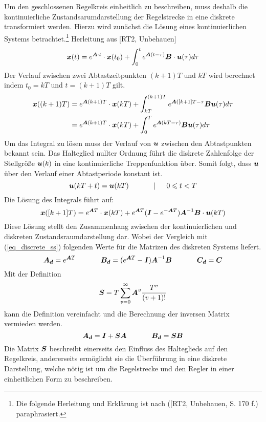 Um den geschlossenen Regelkreis einheitlich zu beschreiben, muss deshalb die kontinuierliche Zustandsarumdarstellung der Regelstrecke in eine diskrete transformiert werden. Hierzu wird zunächst die Lösung eines kontinuierlichen Systems  betrachtet.\footnote{Die folgende Herleitung und Erklärung ist nach ([RT2, Unbehauen, S. 170 f.) paraphrasiert.} Herleitung aus [RT2, Unbehauen]
\begin{equation}
\boldsymbol{x}(t) = e^{\boldsymbol{A}\cdot t}\cdot \boldsymbol{x}(t_0) + \int^t_0 e^{\boldsymbol{A}(t-\tau)}\boldsymbol{B}\cdot \boldsymbol{u}(\tau)d\tau
\end{equation}
Der Verlauf zwischen zwei Abtastzeitpunkten $(k+1)T$ und $kT$ wird berechnet indem $t_0=kT$ und $t=(k+1)T$ gilt.
\begin{equation}
\begin{split}
\boldsymbol{x}( (k+1)T) &= e^{\boldsymbol{A}(k+1)T}\cdot \boldsymbol{x}(kT) + \int^{(k+1)T}_{kT} e^{\boldsymbol{A}([k+1]T-\tau}\boldsymbol{B}\boldsymbol{u}(\tau)d\tau \\
&= e^{\boldsymbol{A}(k+1)T}\cdot \boldsymbol{x}(kT) + \int^T_0 e^{\boldsymbol{A}(kT-\tau)}\boldsymbol{B}\boldsymbol{u}(\tau)d\tau
\end{split}
\end{equation}
Um das Integral zu lösen muss der Verlauf von $\boldsymbol{u}$ zwischen den Abtastpunkten bekannt sein. Das Halteglied nullter Ordnung führt die diskrete Zahlenfolge der Stellgröße $\boldsymbol{u}(k)$ in eine kontinuierliche Treppenfunktion über. Somit folgt, dass $\boldsymbol{u}$ über den Verlauf einer Abtastperiode konstant ist.
\begin{equation}
\boldsymbol{u}(kT+t) = \boldsymbol{u}(kT) \hspace{35pt} \vert \hspace{15pt} 0 \leqslant t < T
\end{equation}
Die Lösung des Integrals führt auf:
\begin{equation}
\boldsymbol{x}([k+1]T) = e^{\boldsymbol{A}T}\cdot \boldsymbol{x}(kT) + e^{\boldsymbol{A}T}(\boldsymbol{I}-e^{-\boldsymbol{A}T})\boldsymbol{A}^{-1}\boldsymbol{B}\cdot \boldsymbol{u}(kT)
\end{equation}
Diese Lösung stellt den Zusammenhang zwischen der kontinuierlichen und diskreten Zustandsraumdarstellung dar. Wobei der Vergleich mit (\ref{eq_discrete_ss}) folgenden Werte für die Matrizen des diskreten Systems  liefert.
\begin{equation}
\boldsymbol{A_d} = e^{\boldsymbol{A}T} \hspace{35pt} \boldsymbol{B_d} = (e^{\boldsymbol{A}T}-\boldsymbol{I})\boldsymbol{A}^{-1}\boldsymbol{B} \hspace{35pt} \boldsymbol{C_d} = \boldsymbol{C}
\end{equation}
Mit der Definition
\begin{equation}
\boldsymbol{S} = T \sum^{\infty}_{v=0}\boldsymbol{A}^v\frac{T^v}{(v+1)!}
\end{equation}
kann die Definition vereinfacht und die Berechnung der inversen Matrix vermieden werden.
\begin{equation}
\boldsymbol{A_d} = \boldsymbol{I}+\boldsymbol{S}\boldsymbol{A}\hspace{35pt} \boldsymbol{B_d} = \boldsymbol{SB}
\end{equation}
Die Matrix $\boldsymbol{S}$ beschreibt einerseits den Einfluss des Halteglieds auf den Regelkreis, andererseits ermöglicht sie die Überführung in eine diskrete Darstellung, welche nötig ist um die Regelstrecke und den Regler in einer einheitlichen Form zu beschreiben. 